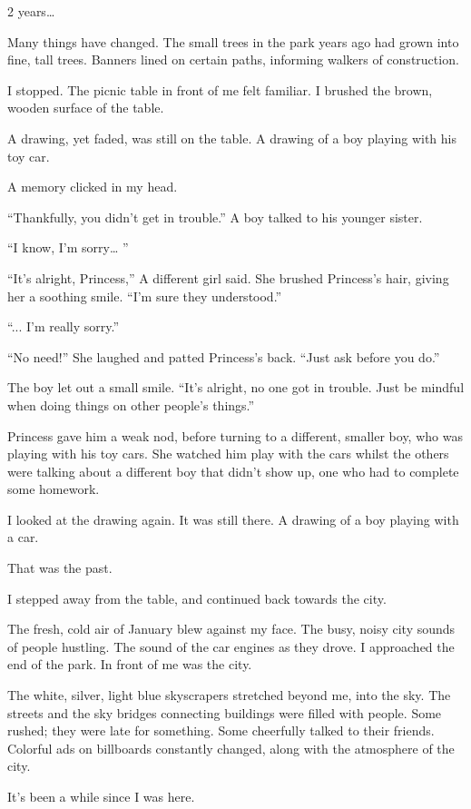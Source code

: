 2 years…

Many things have changed. The small trees in the park years ago had grown into fine, tall trees. Banners lined on certain paths, informing walkers of construction.

I stopped. The picnic table in front of me felt familiar. I brushed the brown, wooden surface of the table.

A drawing, yet faded, was still on the table. A drawing of a boy playing with his toy car.

A memory clicked in my head.

“Thankfully, you didn’t get in trouble.” A boy talked to his younger sister.

“I know, I’m sorry… ”

“It’s alright, Princess,” A different girl said. She brushed Princess’s hair, giving her a soothing smile. “I’m sure they understood.” 

“... I’m really sorry.”

“No need!” She laughed and patted Princess’s back. “Just ask before you do.”

The boy let out a small smile. “It’s alright, no one got in trouble. Just be mindful when doing things on other people’s things.”

Princess gave him a weak nod, before turning to a different, smaller boy, who was playing with his toy cars. She watched him play with the cars whilst the others were talking about a different boy that didn’t show up, one who had to complete some homework.

I looked at the drawing again. It was still there. A drawing of a boy playing with a car. 

That was the past.

I stepped away from the table, and continued back towards the city.

The fresh, cold air of January blew against my face. The busy, noisy city sounds of people hustling. The sound of the car engines as they drove. I approached the end of the park. In front of me was the city.

The white, silver, light blue skyscrapers stretched beyond me, into the sky. The streets and the sky bridges connecting buildings were filled with people. Some rushed; they were late for something. Some cheerfully talked to their friends. Colorful ads on billboards constantly changed, along with the atmosphere of the city.

It’s been a while since I was here.

